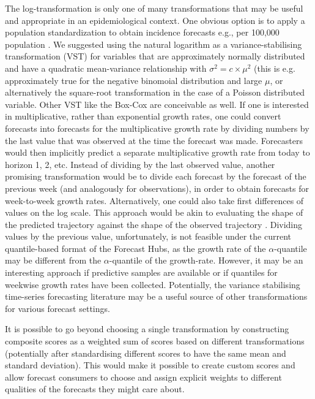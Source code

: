 \documentclass{article}
\begin{document}
The log-transformation is only one of many transformations that may be useful and appropriate in an epidemiological context. One obvious option is to apply a population standardization to obtain incidence forecasts e.g., per 100,000 population \citep{abbottEvaluatingEpidemiologicallyMotivated2022}. 
We suggested using the natural logarithm as a variance-stabilising transformation (VST) for variables that are approximately normally distributed and have a quadratic mean-variance relationship with $\sigma^2 = c \times \mu^2$ (this is e.g. approximately true for the negative binomoial distribution and large $\mu$, or alternatively the square-root transformation in the case of a Poisson distributed variable. Other VST like the Box-Cox \citep{boxAnalysisTransformations1964} are conceivable as well.
If one is interested in multiplicative, rather than exponential growth rates, one could convert forecasts into forecasts for the multiplicative growth rate by dividing numbers by the last value that was observed at the time the forecast was made. Forecasters would then implicitly predict a separate multiplicative growth rate from today to horizon 1, 2, etc. 
Instead of dividing by the last observed value, another promising transformation would be to divide each forecast by the forecast of the previous week (and analogously for observations), in order to obtain forecasts for week-to-week growth rates. Alternatively, one could also take first differences of values on the log scale. This approach would be akin to evaluating the shape of the predicted trajectory against the shape of the observed trajectory \citep[for a different approach to evaluating the shape of a forecast, see][]{srivastavaShapebasedEvaluationEpidemic2022}. Dividing values by the previous value, unfortunately, is not feasible under the current quantile-based format of the Forecast Hubs, as the growth rate of the $\alpha$-quantile may be different from the $\alpha$-quantile of the growth-rate. However, it may be an interesting approach if predictive samples are available or if quantiles for weekwise growth rates have been collected. Potentially, the variance stabilising time-series forecasting literature may be a useful source of other transformations for various forecast settings. 

It is possible to go beyond choosing a single transformation by constructing composite scores as a weighted sum of scores based on different transformations (potentially after standardising different scores to have the same mean and standard deviation). This would make it possible to create custom scores and allow forecast consumers to choose and assign explicit weights to different qualities of the forecasts they might care about.
\end{document}
